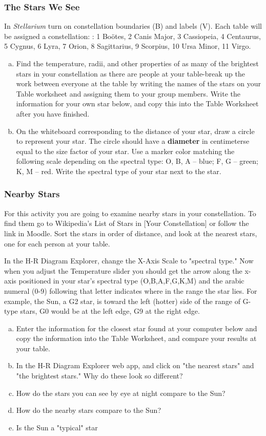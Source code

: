 \documentclass[main.tex]{subfiles}
\begin{document}
\subsubsection{The Stars We See}
In \textit{Stellarium} turn on constellation boundaries (B) and labels (V). Each table will be assigned a constellation: : 1 Boötes, 2 Canis Major, 3 Cassiopeia, 4 Centaurus, 5 Cygnus, 6 Lyra, 7 Orion, 8 Sagittarius, 9 Scorpius, 10 Ursa Minor, 11 Virgo. \begin{enumerate} [a.]
    \item Find the temperature, radii, and other properties of as many of the brightest stars in your constellation as there are people at your table-break up the work between everyone at the table by writing the names of the stars on your Table worksheet and assigning them to your group members. Write the information for your own star below, and copy this into the Table Worksheet after you have finished. 
    \item On the whiteboard corresponding to the distance of your star, draw a circle to represent your star. The circle should have a \textbf{diameter} in centimeterse equal to the size factor of your star. Use a marker color matching the following scale depending on the spectral type: O, B, A – blue; F, G – green; K, M – red. Write the spectral type of your star next to the star.
\end{enumerate}

\subsubsection{Nearby Stars}
For this activity you are going to examine nearby stars in your constellation. To find them go to Wikipedia's List of Stars in [Your Constellation] or follow the link in Moodle. Sort the stars in order of distance, and look at the nearest stars, one for each person at your table. 

In the H-R Diagram Explorer, change the X-Axis Scale to "spectral type." Now when you adjust the Temperature slider you should get the arrow along the x-axis positioned in your star's spectral type (O,B,A,F,G,K,M) and the arabic numeral (0-9) following that letter indicates where in the range the star lies. For example, the Sun, a G2 star, is toward the left (hotter) side of the range of G-type stars, G0 would be at the left edge, G9 at the right edge.
\begin{enumerate} [a.]
    \item Enter the information for the closest star found at your computer below and copy the information into the Table Worksheet, and compare your results at your table.
    \item In the H-R Diagram Explorer web app, and click on "the nearest stars" and "the brightest stars." Why do these look so different?
    \item How do the stars you can see by eye at night compare to the Sun?
    \item How do the nearby stars compare to the Sun?
    \item Is the Sun a "typical" star
\end{enumerate}
\end{document}
